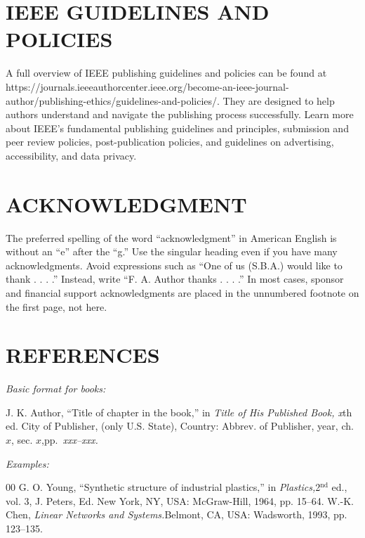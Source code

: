 \documentclass{ieeetmlcn}
\begin{document}
\section{IEEE GUIDELINES AND POLICIES}

A full overview of IEEE publishing guidelines and policies can be found at https://journals.ieeeauthorcenter.ieee.org/become-an-ieee-journal-author/publishing-ethics/guidelines-and-policies/. They are designed to help authors understand and navigate the publishing process successfully. Learn more about IEEE's fundamental publishing guidelines and principles, submission and peer review policies, post-publication policies, and guidelines on advertising, accessibility, and data privacy.

\section*{ACKNOWLEDGMENT}
The preferred spelling of the word ``acknowledgment'' in
American English is without an ``e'' after the ``g.'' Use the
singular heading even if you have many acknowledgments.
Avoid expressions such as ``One of us (S.B.A.) would like
to thank . . . .'' Instead, write ``F. A. Author thanks . . . .'' In
most cases, sponsor and financial support acknowledgments
are placed in the unnumbered footnote on the first page, not
here.

\section*{REFERENCES}

\def\refname{\vadjust{\vspace*{-2.5em}}} %

\noindent\textit{Basic format for books:}

\noindent J. K. Author, ``Title of chapter in the book,'' in {\it Title of His Published Book, x}th ed. City of Publisher,
(only U.S. State), Country: Abbrev. of Publisher, year, ch. $x$, sec. $x$,\break pp.~{\it xxx--xxx.}

{\it Examples:}

\begin{thebibliography}{00}
 G. O. Young, ``Synthetic structure of industrial plastics,'' in {\it Plastics,}2$^{\mathrm{nd}}$ ed., vol. 3, J. Peters, Ed. New York, NY, USA: McGraw-Hill, 1964, pp. 15--64.
 W.-K. Chen, {\it Linear Networks and Systems.}Belmont, CA, USA: Wadsworth, 1993, pp. 123--135.
\end{thebibliography}
\end{document}
